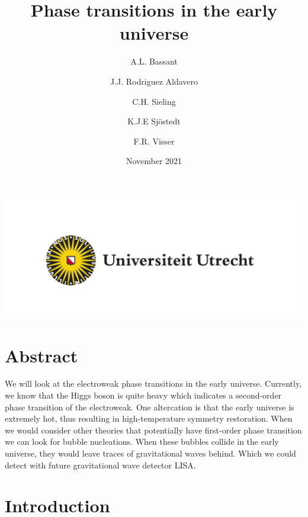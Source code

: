 \documentclass{article}
\title{Phase transitions in the early universe}
\author{
  A.L. Bassant\\
  \and
  J.J. Rodriguez Aldavero\\
  \and
  C.H. Sieling\\
  \and
  K.J.E Sjöstedt\\
  \and
  F.R. Visser\\
}
\date{November 2021}
\numberwithin{equation}{section}
\begin{document}
\maketitle

\begin{center}
    \includegraphics[]{UU_logo_NL_RGB.jpg}
    \section*{Abstract}  
\end{center}

We will look at the electroweak phase transitions in the early universe.
Currently, we know that the Higgs boson is quite heavy which indicates a second-order phase transition of the electroweak.
One altercation is that the early universe is extremely hot, thus resulting in high-temperature symmetry restoration.
When we would consider other theories that potentially have first-order phase transition we can look for bubble nucleations.
When these bubbles collide in the early universe, they would leave traces of gravitational waves behind.
Which we could detect with future gravitational wave detector LISA.


\newpage


\tableofcontents


\section{Introduction}
\end{document}
